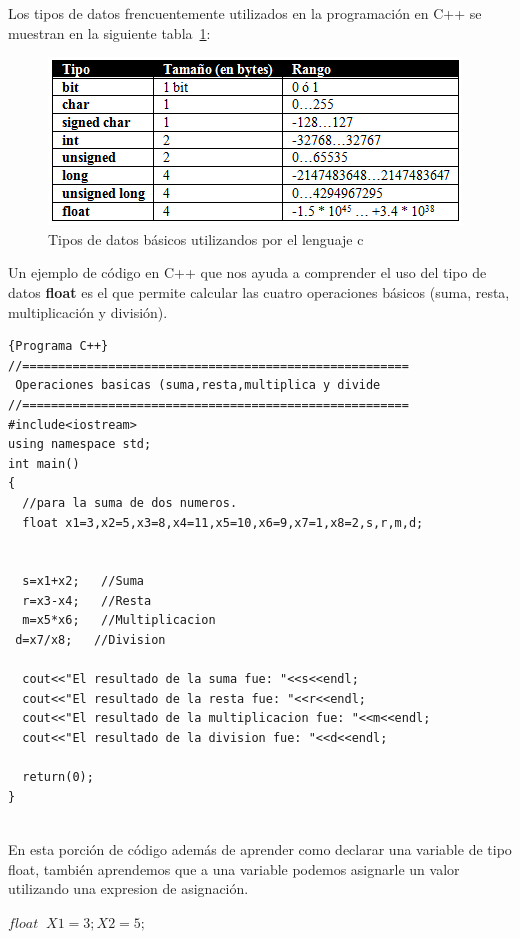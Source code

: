 \documentclass[a4paper,12pt,spanish]{article}
\begin{document}
Los tipos de datos frencuentemente utilizados en la programación en C++ se muestran en la siguiente tabla~\ref{fig:tiposdatosc}: 

\begin{figure}[H]
  \centering
  \includegraphics[scale=0.9]{TiposDatosC}
  \caption{Tipos de datos básicos utilizandos por el lenguaje c}
  \label{fig:tiposdatosc}
\end{figure}

Un ejemplo de código en C++ que nos ayuda a comprender el uso del tipo de datos \textbf{float} es el que permite calcular las cuatro operaciones básicos (suma, resta, multiplicación y división).

\begin{lstlisting}[frame=trBL,firstnumber=1,caption={\textbf{OperBasi1.cpp}: Operaciones Básicas}]{Programa C++}
//======================================================
 Operaciones basicas (suma,resta,multiplica y divide
//======================================================
#include<iostream>
using namespace std;
int main()
{
  //para la suma de dos numeros.
  float x1=3,x2=5,x3=8,x4=11,x5=10,x6=9,x7=1,x8=2,s,r,m,d;


  s=x1+x2;   //Suma
  r=x3-x4;   //Resta
  m=x5*x6;   //Multiplicacion
 d=x7/x8;   //Division

  cout<<"El resultado de la suma fue: "<<s<<endl;
  cout<<"El resultado de la resta fue: "<<r<<endl;
  cout<<"El resultado de la multiplicacion fue: "<<m<<endl;
  cout<<"El resultado de la division fue: "<<d<<endl;

  return(0);
}
  
\end{lstlisting}

En esta porción de código además de aprender como declarar una variable de tipo float, también  aprendemos que a una variable podemos asignarle un valor utilizando una expresion de asignación.

    \begin{tcolorbox}[title=''Declaración de variable y Expresión de asignación'']
      $ float \; \;  X1=3; X2=5; $
    \end{tcolorbox}
\end{document}
